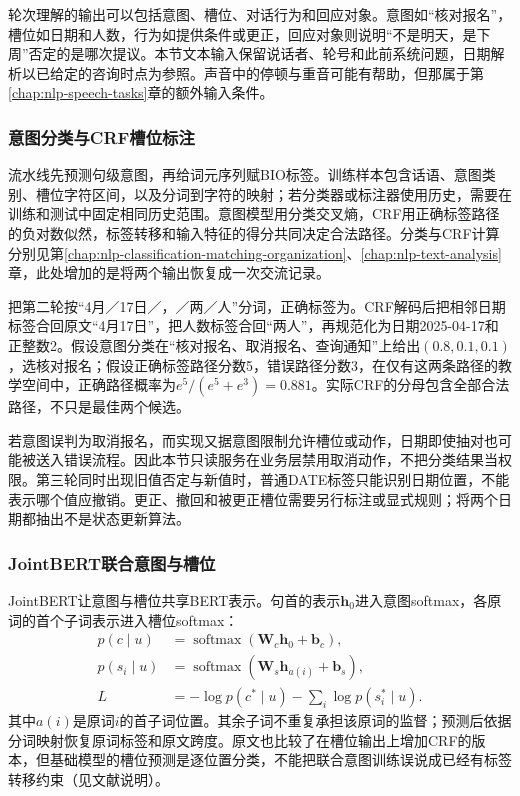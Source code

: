 轮次理解的输出可以包括意图、槽位、对话行为和回应对象。意图如“核对报名”，槽位如日期和人数，行为如提供条件或更正，回应对象则说明“不是明天，是下周”否定的是哪次提议。本节文本输入保留说话者、轮号和此前系统问题，日期解析以已给定的咨询时点为参照。声音中的停顿与重音可能有帮助，但那属于第\ref{chap:nlp-speech-tasks}章的额外输入条件。

\subsubsection{意图分类与CRF槽位标注}
\label{sec:nlp-dialogue-intent-crf}

流水线先预测句级意图，再给词元序列赋BIO标签。训练样本包含话语、意图类别、槽位字符区间，以及分词到字符的映射；若分类器或标注器使用历史，需要在训练和测试中固定相同历史范围。意图模型用分类交叉熵，CRF用正确标签路径的负对数似然，标签转移和输入特征的得分共同决定合法路径。分类与CRF计算分别见第\ref{chap:nlp-classification-matching-organization}、\ref{chap:nlp-text-analysis}章，此处增加的是将两个输出恢复成一次交流记录。

把第二轮按“4月／17日／，／两／人”分词，正确标签为。CRF解码后把相邻日期标签合回原文“4月17日”，把人数标签合回“两人”，再规范化为日期2025-04-17和正整数2。假设意图分类在“核对报名、取消报名、查询通知”上给出$(0.8,0.1,0.1)$，选核对报名；假设正确标签路径分数5，错误路径分数3，在仅有这两条路径的教学空间中，正确路径概率为$e^5/(e^5+e^3)=0.881$。实际CRF的分母包含全部合法路径，不只是最佳两个候选。

若意图误判为取消报名，而实现又据意图限制允许槽位或动作，日期即使抽对也可能被送入错误流程。因此本节只读服务在业务层禁用取消动作，不把分类结果当权限。第三轮同时出现旧值否定与新值时，普通DATE标签只能识别日期位置，不能表示哪个值应撤销。更正、撤回和被更正槽位需要另行标注或显式规则；将两个日期都抽出不是状态更新算法。

\subsubsection{JointBERT联合意图与槽位}
\label{sec:nlp-dialogue-jointbert}

JointBERT让意图与槽位共享BERT表示。句首\code{[CLS]}的表示$\bm{h}_0$进入意图softmax，各原词的首个子词表示进入槽位softmax：
\begin{equation}
\begin{aligned}
 p(c\mid u)&=\operatorname{softmax}(\bm{W}_{c}\bm{h}_0+\bm{b}_{c}),\\
 p(s_i\mid u)&=\operatorname{softmax}(\bm{W}_{s}\bm{h}_{a(i)}+\bm{b}_{s}),\\
 L&=-\log p(c^*\mid u)-\sum_i\log p(s_i^*\mid u).
\end{aligned}
\label{eq:nlp-dialogue-jointbert}
\end{equation}
其中$a(i)$是原词$i$的首子词位置。其余子词不重复承担该原词的监督；预测后依据分词映射恢复原词标签和原文跨度。原文也比较了在槽位输出上增加CRF的版本，但基础模型的槽位预测是逐位置分类，不能把联合意图训练误说成已经有标签转移约束（见文献说明）。

